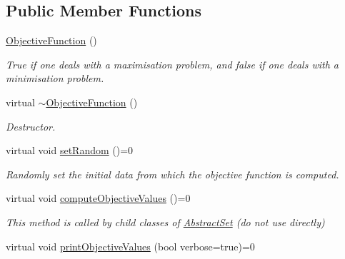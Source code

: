 \subsection*{Public Member Functions}
\begin{DoxyCompactItemize}
\item 
\hyperlink{classObjectiveFunction_a227885b9e68935571bf25d36689f029a}{Objective\-Function} ()
\begin{DoxyCompactList}\small\item\em True if one deals with a maximisation problem, and false if one deals with a minimisation problem. \end{DoxyCompactList}\item 
\hypertarget{classObjectiveFunction_a877b09fea55318719b9f37661ecdedf8}{virtual \hyperlink{classObjectiveFunction_a877b09fea55318719b9f37661ecdedf8}{$\sim$\-Objective\-Function} ()}\label{classObjectiveFunction_a877b09fea55318719b9f37661ecdedf8}

\begin{DoxyCompactList}\small\item\em Destructor. \end{DoxyCompactList}\item 
\hypertarget{classObjectiveFunction_a897009c58cc55bc84c29e5e3a2bfcb61}{virtual void \hyperlink{classObjectiveFunction_a897009c58cc55bc84c29e5e3a2bfcb61}{set\-Random} ()=0}\label{classObjectiveFunction_a897009c58cc55bc84c29e5e3a2bfcb61}

\begin{DoxyCompactList}\small\item\em Randomly set the initial data from which the objective function is computed. \end{DoxyCompactList}\item 
\hypertarget{classObjectiveFunction_a517095eb98863d0727a768d92fe2da0f}{virtual void \hyperlink{classObjectiveFunction_a517095eb98863d0727a768d92fe2da0f}{compute\-Objective\-Values} ()=0}\label{classObjectiveFunction_a517095eb98863d0727a768d92fe2da0f}

\begin{DoxyCompactList}\small\item\em This method is called by child classes of \hyperlink{classAbstractSet}{Abstract\-Set} (do not use directly) \end{DoxyCompactList}\item 
\hypertarget{classObjectiveFunction_a7c59c162ea11841ade84d62fd29f0694}{virtual void \hyperlink{classObjectiveFunction_a7c59c162ea11841ade84d62fd29f0694}{print\-Objective\-Values} (bool verbose=true)=0}\label{classObjectiveFunction_a7c59c162ea11841ade84d62fd29f0694}


\end{DoxyCompactItemize}
